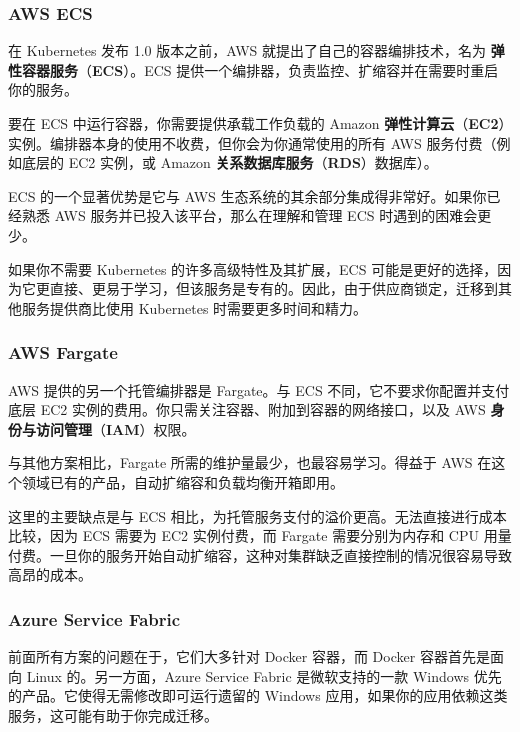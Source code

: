 \subsubsection{AWS ECS}

\label{idx:1831}
\label{idx:1832}
在 Kubernetes 发布 1.0 版本之前，AWS 就提出了自己的容器编排技术，名为 \textbf{弹性容器服务}（\textbf{ECS}）。ECS 提供一个编排器，负责监控、扩缩容并在需要时重启你的服务。

\label{idx:1833}
\label{idx:1834}
要在 ECS 中运行容器，你需要提供承载工作负载的 Amazon \textbf{弹性计算云}（\textbf{EC2}）实例。编排器本身的使用不收费，但你会为你通常使用的所有 AWS 服务付费（例如底层的 EC2 实例，或 Amazon \textbf{关系数据库服务}（\textbf{RDS}）数据库）。

ECS 的一个显著优势是它与 AWS 生态系统的其余部分集成得非常好。如果你已经熟悉 AWS 服务并已投入该平台，那么在理解和管理 ECS 时遇到的困难会更少。

\label{idx:1835}
\label{idx:1836}
如果你不需要 Kubernetes 的许多高级特性及其扩展，ECS 可能是更好的选择，因为它更直接、更易于学习，但该服务是专有的。因此，由于供应商锁定，迁移到其他服务提供商比使用 Kubernetes 时需要更多时间和精力。

\subsubsection{AWS Fargate}

\label{idx:1837}
\label{idx:1838}
\label{idx:1839}
AWS 提供的另一个托管编排器是 Fargate。与 ECS 不同，它不要求你配置并支付底层 EC2 实例的费用。你只需关注容器、附加到容器的网络接口，以及 AWS \textbf{身份与访问管理}（\textbf{IAM}）权限。

与其他方案相比，Fargate 所需的维护量最少，也最容易学习。得益于 AWS 在这个领域已有的产品，自动扩缩容和负载均衡开箱即用。

这里的主要缺点是与 ECS 相比，为托管服务支付的溢价更高。无法直接进行成本比较，因为 ECS 需要为 EC2 实例付费，而 Fargate 需要分别为内存和 CPU 用量付费。一旦你的服务开始自动扩缩容，这种对集群缺乏直接控制的情况很容易导致高昂的成本。

\subsubsection{Azure Service Fabric}

\label{idx:1840}
\label{idx:1841}
前面所有方案的问题在于，它们大多针对 Docker 容器，而 Docker 容器首先是面向 Linux 的。另一方面，Azure Service Fabric 是微软支持的一款 Windows 优先的产品。它使得无需修改即可运行遗留的 Windows 应用，如果你的应用依赖这类服务，这可能有助于你完成迁移。

